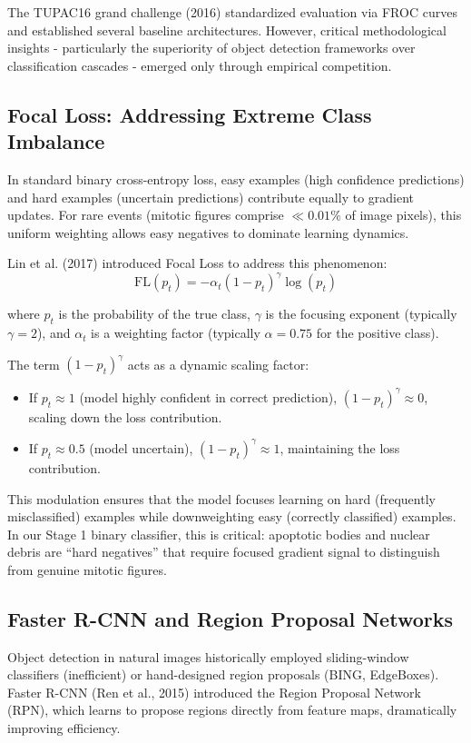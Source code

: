 \documentclass[journal]{IEEEtran}
\begin{document}
The TUPAC16 grand challenge (2016) standardized evaluation via FROC curves and established several baseline architectures. However, critical methodological insights - particularly the superiority of object detection frameworks over classification cascades - emerged only through empirical competition.

\subsection{Focal Loss: Addressing Extreme Class Imbalance}
In standard binary cross-entropy loss, easy examples (high confidence predictions) and hard examples (uncertain predictions) contribute equally to gradient updates. For rare events (mitotic figures comprise $\ll 0.01\%$ of image pixels), this uniform weighting allows easy negatives to dominate learning dynamics.

Lin et al. (2017) introduced Focal Loss to address this phenomenon:
\begin{equation}
\text{FL}(p_t) = -\alpha_t (1-p_t)^{\gamma} \log(p_t)
\end{equation}

where $p_t$ is the probability of the true class, $\gamma$ is the focusing exponent (typically $\gamma = 2$), and $\alpha_t$ is a weighting factor (typically $\alpha = 0.75$ for the positive class).

The term $(1-p_t)^{\gamma}$ acts as a dynamic scaling factor:
\begin{itemize}
\item If $p_t \approx 1$ (model highly confident in correct prediction), $(1-p_t)^{\gamma} \approx 0$, scaling down the loss contribution.
\item If $p_t \approx 0.5$ (model uncertain), $(1-p_t)^{\gamma} \approx 1$, maintaining the loss contribution.
\end{itemize}

This modulation ensures that the model focuses learning on hard (frequently misclassified) examples while downweighting easy (correctly classified) examples. In our Stage 1 binary classifier, this is critical: apoptotic bodies and nuclear debris are ``hard negatives'' that require focused gradient signal to distinguish from genuine mitotic figures.

\subsection{Faster R-CNN and Region Proposal Networks}
Object detection in natural images historically employed sliding-window classifiers (inefficient) or hand-designed region proposals (BING, EdgeBoxes). Faster R-CNN (Ren et al., 2015) introduced the Region Proposal Network (RPN), which learns to propose regions directly from feature maps, dramatically improving efficiency.
\end{document}
